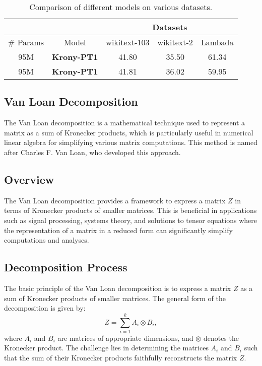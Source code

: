 \documentclass{article}
\begin{document}
{\begin{table}[h]
\centering
\begin{tabular}{|c|c|c|c|c|}
\hline

 & & \multicolumn{3}{c|}{Datasets} \\ \hline
\# Params &  Model            & wikitext-103 & wikitext-2 & Lambada \\ \hline
95M       & \textbf{Krony-PT1}  & 41.80        & 35.50      & 61.34         \\ \hline
95M       & \textbf{Krony-PT1}  & 41.81        & 36.02      & 59.95         \\ \hline
\end{tabular}
\caption{Comparison of different models on various datasets.}
\end{table}

\subsection{Van Loan Decomposition}

The Van Loan decomposition is a mathematical technique used to represent a matrix as a sum of Kronecker products, which is particularly useful in numerical linear algebra for simplifying various matrix computations. This method is named after Charles F. Van Loan, who developed this approach.

\subsection{Overview}

The Van Loan decomposition provides a framework to express a matrix \( Z \) in terms of Kronecker products of smaller matrices. This is beneficial in applications such as signal processing, systems theory, and solutions to tensor equations where the representation of a matrix in a reduced form can significantly simplify computations and analyses.

\subsection{Decomposition Process}

The basic principle of the Van Loan decomposition is to express a matrix \( Z \) as a sum of Kronecker products of smaller matrices. The general form of the decomposition is given by:
\begin{equation}
    Z = \sum_{i=1}^k A_i \otimes B_i,
\end{equation}
where \( A_i \) and \( B_i \) are matrices of appropriate dimensions, and \( \otimes \) denotes the Kronecker product. The challenge lies in determining the matrices \( A_i \) and \( B_i \) such that the sum of their Kronecker products faithfully reconstructs the matrix \( Z \).

}
\end{document}
